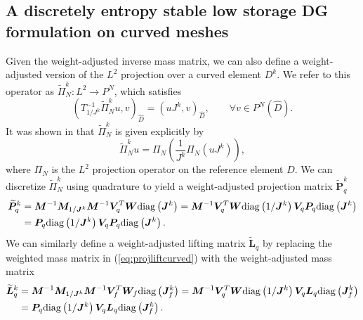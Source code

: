 \documentclass[preprint,10pt]{article}
\theoremstyle{definition}
\theoremstyle{lemma}
\theoremstyle{theorem}
\theoremstyle{assumption}
\renewcommand{\hat}{\widehat}
\renewcommand{\tilde}{\widetilde}
\newcommand{\LRp}[1]{\left( #1 \right)}
\newcommand{\diag}[1]{{\rm diag}\LRp{#1}}
\begin{document}
{\subsection{A discretely entropy stable low storage DG formulation on curved meshes}

Given the weight-adjusted inverse mass matrix, we can also define a weight-adjusted version of the $L^2$ projection over a curved element $D^k$.  We refer to this operator as $\tilde{\Pi}^k_N: L^2\rightarrow P^N$, which satisfies
\[
\LRp{T^{-1}_{1/J^k}\tilde{\Pi}^k_N u,v}_{\hat{D}} = \LRp{uJ^k,v}_{\hat{D}}, \qquad \forall v\in P^N\LRp{\hat{D}}.
\]
It was shown in \cite{chan2016weight2} that $\tilde{\Pi}^k_N $ is given explicitly by
\begin{equation}
\tilde{\Pi}^k_N u = \Pi_N\LRp{\frac{1}{J^k}\Pi_N\LRp{uJ^k}},
\label{eq:wadgproj}
\end{equation}
where $\Pi_N$ is the $L^2$ projection operator on the reference element $\hat{D}$.  We can discretize $\tilde{\Pi}^k_N$ using quadrature to yield a weight-adjusted projection matrix $\tilde{\bm{P}}^k_q$ 
\begin{align}
\tilde{\bm{P}}^k_q &= \bm{M}^{-1}\bm{M}_{1/\bm{J}^k}\bm{M}^{-1}\bm{V}_q^T\bm{W}\diag{\bm{J}^k} = \bm{M}^{-1}\bm{V}_q^T\bm{W}\diag{1/\bm{J}^k} \bm{V}_q\bm{P}_q\diag{\bm{J}^k} \nonumber\\
&= \bm{P}_q \diag{{1}/{\bm{J}^k}} \bm{V}_q\bm{P}_q \diag{\bm{J}^k}.
\label{eq:wadgproj}
\end{align}
We can similarly define a weight-adjusted lifting matrix $\tilde{\bm{L}}_q$ by replacing the weighted mass matrix in (\ref{eq:projliftcurved}) with the weight-adjusted mass matrix
\begin{align}
\tilde{\bm{L}}^k_q &= \bm{M}^{-1}\bm{M}_{1/\bm{J}^k}\bm{M}^{-1}\bm{V}_f^T\bm{W}_f\diag{\bm{J}^k_f} = \bm{M}^{-1}\bm{V}_q^T\bm{W}\diag{1/\bm{J}^k} \bm{V}_q\bm{L}_q\diag{\bm{J}^k_f} \nonumber\\
&= \bm{P}_q \diag{{1}/{\bm{J}^k}} \bm{V}_q\bm{L}_q \diag{\bm{J}^k_f}.
\label{eq:wadglift}
\end{align}

}
\end{document}
